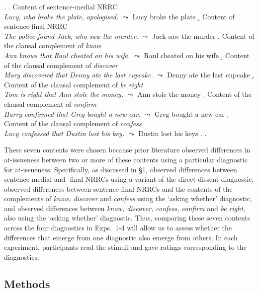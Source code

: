 \documentclass[times,linguex,xcolor]{glossa}
\begin{document}
    \ex.\label{stims}
    \a.\label{stims.a} Content of sentence-medial NRRC \\
      \emph{Lucy, who broke the plate, apologised.} $\leadsto$ Lucy broke the plate
    \b.\label{stims.b} Content of sentence-final NRRC \\
    \emph{The police found Jack, who saw the murder.} $\leadsto$ Jack saw the murder
    \b.\label{stims.c} Content of the clausal complement of \emph{know} \\
    \emph{Ann knows that Raul cheated on his wife.} $\leadsto$ Raul cheated on his wife
    \b.\label{stims.d} Content of the clausal complement of \emph{discover} \\
    \emph{Mary discovered that Denny ate the last cupcake.} $\leadsto$ Denny ate the last cupcake
    \b.\label{stims.e} Content of the clausal complement of \emph{be right} \\
    \emph{Tom is right that Ann stole the money.} $\leadsto$ Ann stole the money
    \b.\label{stims.f} Content of the clausal complement of \emph{confirm} \\
    \emph{Harry confirmed that Greg bought a new car.} $\leadsto$ Greg bought a new car
    \b.\label{stims.g} Content of the clausal complement of \emph{confess}  \\
    \emph{Lucy confessed that Dustin lost his key.} $\leadsto$ Dustin lost his keys
    \z.
    \z.

    These seven contents were chosen because prior literature observed differences in at-issueness between two or more of these contents using a particular diagnostic for at-issueness.  Specifically, as discussed in \S1, \citealt{syrett_experimental_2015} observed differences between sentence-medial and -final NRRCs using a variant of the direct-dissent diagnostic, \citealt{tonhauser_how_2018} observed differences between sentence-final NRRCs and the contents of the complements of \emph{know, discover} and \emph{confess} using the `asking whether' diagnostic, and \citealt{degen-tonhauser-glossa} observed differences between \emph{know, discover, confess, confirm} and \emph{be right}, also using the `asking whether' diagnostic. Thus, comparing these seven contents across the four diagnostics in Exps.~1-4 will allow us to assess whether the differences that emerge from one diagnostic also emerge from others. In each experiment, participants read the stimuli and gave ratings corresponding to the diagnostics.

  \subsection{Methods}
    
\end{document}
